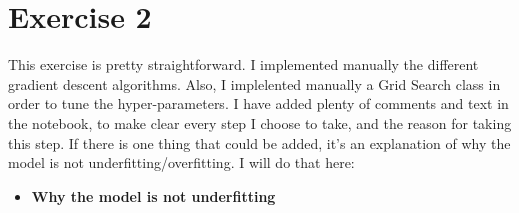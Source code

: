 \documentclass[12pt]{report}
\begin{document}
\section*{Exercise 2}
This exercise is pretty straightforward. I implemented manually the different gradient descent
algorithms. Also, I implelented manually a Grid Search class in order to tune the hyper-parameters.
I have added plenty of comments and text in the notebook, to make clear every step I choose to take,
and the reason for taking this step. If there is one thing that could be added, it's an explanation
of why the model is not underfitting/overfitting. I will do that here:

\begin{itemize}
    \item \textbf{Why the model is not underfitting}
\end{itemize}
\end{document}
